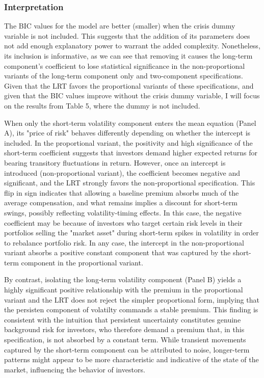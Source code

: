 \documentclass[12pt]{article}
\begin{document}
\subsubsection{Interpretation}
The BIC values for the model are better (smaller) when the crisis dummy variable is not included. This suggests that the addition of its parameters does not add enough explanatory power to warrant the added complexity. Nonetheless, its inclusion is informative, as we can see that removing it causes the long-term component's coefficient to lose statistical significance in the non-proportional variants of the long-term component only and two-component specifications. Given that the LRT favors the proportional variants of these specifications, and given that the BIC values improve without the crisis dummy variable, I will focus on the results from Table 5, where the dummy is not included.\par
When only the short‐term volatility component enters the mean equation (Panel A), its "price of risk" behaves differently depending on whether the intercept is included. In the proportional variant, the positivity and high significance of the short-term coefficient suggests that investors demand higher expected returns for bearing transitory fluctuations in return. However, once an intercept is introduced (non‑proportional variant), the coefficient becomes negative and significant, and the LRT strongly favors the non‑proportional specification. This flip in sign indicates that allowing a baseline premium absorbs much of the average compensation, and what remains implies a discount for short‐term swings, possibly reflecting volatility‐timing effects. In this case, the negative coefficient may be because of investors who target certain risk levels in their portfolios selling the "market asset" during short-term spikes in volatility in order to rebalance portfolio risk. In any case, the intercept in the non-proportional variant absorbs a positive constant component that was captured by the short-term component in the proportional variant.\par
By contrast, isolating the long‑term volatility component (Panel B) yields a highly significant positive relationship with the premium in the proportional variant and the LRT does not reject the simpler proportional form, implying that the persisten component of volatilty commands a stable premium. This finding is consistent with the intuition that persistent uncertainty constitutes genuine background risk for investors, who therefore demand a premium that, in this specification, is not absorbed by a constant term. While transient movements captured by the short-term component can be attributed to noise, longer-term patterns might appear to be more characteristic and indicative of the state of the market, influencing the behavior of investors.\par
\end{document}

